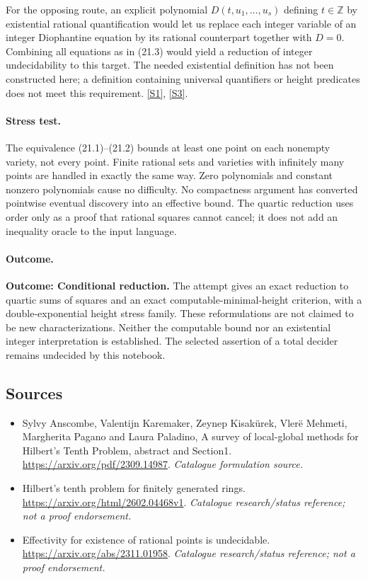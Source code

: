 \documentclass[11pt,a4paper]{article}
\newcommand{\Z}{\mathbb{Z}}
\newcommand{\sref}[2]{\hyperlink{source:#1:#2}{[S#2]}}
\begin{document}
For the opposing route, an explicit polynomial
$D(t,u_1,\ldots,u_s)$ defining $t\in\Z$ by existential rational
quantification would let us replace each integer variable of an integer
Diophantine equation by its rational counterpart together with $D=0$.
Combining all equations as in (21.3) would yield a reduction of integer
undecidability to this target. The needed existential definition has not
been constructed here; a definition containing universal quantifiers or
height predicates does not meet this requirement. \sref{30006684}{1},
\sref{30006684}{3}.

\paragraph{Stress test.}
The equivalence (21.1)--(21.2) bounds at least one point on each nonempty
variety, not every point. Finite rational sets and varieties with
infinitely many points are handled in exactly the same way. Zero
polynomials and constant nonzero polynomials cause no difficulty.
No compactness argument has converted pointwise eventual discovery into
an effective bound. The quartic reduction uses order only as a proof
that rational squares cannot cancel; it does not add an inequality
oracle to the input language.

\paragraph{Outcome.}
\textbf{Outcome: Conditional reduction.}
The attempt gives an exact reduction to quartic sums of squares and an
exact computable-minimal-height criterion, with a double-exponential
height stress family. These reformulations are not claimed to be new
characterizations. Neither the computable bound nor an existential
integer interpretation is established. The selected assertion of a
total decider remains undecided by this notebook.
\subsection{Sources}
\begin{itemize}\raggedright
\item[\textnormal{[S1]}]\hypertarget{source:30006684:1}{} Sylvy Anscombe, Valentijn Karemaker, Zeynep Kisakürek, Vlerë Mehmeti, Margherita Pagano and Laura Paladino, A survey of local-global methods for Hilbert's Tenth Problem, abstract and Section1.
\url{https://arxiv.org/pdf/2309.14987}.
{\small\textit{Catalogue formulation source.}}
\item[\textnormal{[S2]}]\hypertarget{source:30006684:2}{} Hilbert's tenth problem for finitely generated rings.
\url{https://arxiv.org/html/2602.04468v1}.
{\small\textit{Catalogue research/status reference; not a proof endorsement.}}
\item[\textnormal{[S3]}]\hypertarget{source:30006684:3}{} Effectivity for existence of rational points is undecidable.
\url{https://arxiv.org/abs/2311.01958}.
{\small\textit{Catalogue research/status reference; not a proof endorsement.}}
\end{itemize}

\end{document}
